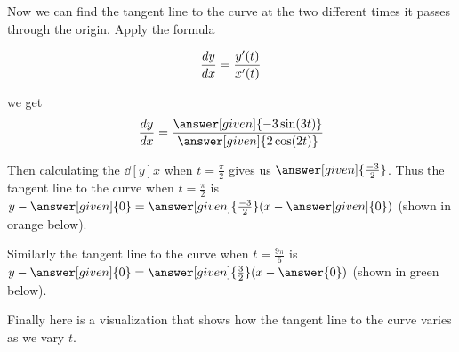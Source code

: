 \documentclass{ximera}
\begin{document}
\begin{example}




 Now we can find the tangent line to the curve at the two different times it passes through the origin. 
Apply the formula 


\[
\frac{\mathop{}\!d y}{\mathop{}\!d x} = \frac{ y'(t)}{x'(t)}
\]

we get 
\[
\dd[y]{x}=\frac{\answer[given]{-3\sin(3t)}}{\answer[given]{2\cos(2t)}}
\]


Then calculating the $\dd[y]{x}$ when $t=\frac{\pi}{2}$ gives us $\answer[given]{ \frac{-3}{2}  }$. Thus the tangent line to the curve when $t=\frac{\pi}{2}$ is 
$y-\answer[given]{ 0}=\answer[given]{\frac{-3}{2}}(x-\answer[given]{0})$ (shown in orange below). 

Similarly the tangent line to the curve when $t=\frac{9\pi}{6}$ is $y-\answer[given]{0}=\answer[given]{\frac{3}{2}  }(x-\answer{0})$ (shown in green below).


\begin{image}
\end{image}



Finally here is a visualization that shows how the tangent line to the curve varies as we vary $t$. 


\end{example}
\end{document}
